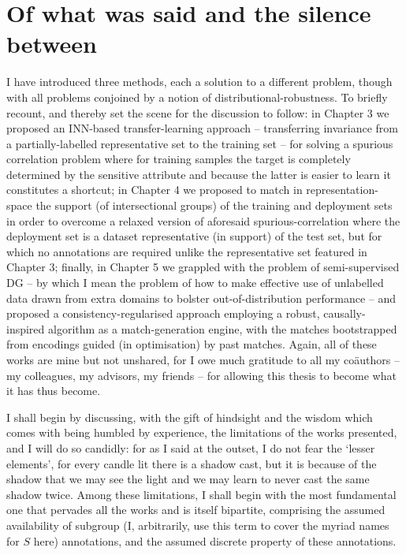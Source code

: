 \section*{Of what was said and the silence between}\label{sec:what-was-said}
%
I have introduced three methods, each a solution to a different problem, though with all problems
conjoined by a notion of distributional-robustness.
%
%
To briefly recount, and thereby set the scene for the discussion to follow: in Chapter 3 we
proposed an INN-based transfer-learning approach -- transferring invariance from a
partially-labelled representative set to the training set -- for solving a spurious correlation
problem where for training samples the target is completely determined by the sensitive attribute
and because the latter is easier to learn it constitutes a shortcut;
%
in Chapter 4 we proposed to match in representation-space the support (of intersectional groups) of
the training and deployment sets in order to overcome a relaxed version of aforesaid
spurious-correlation where the deployment set is a dataset representative (in support) of the test
set, but for which no annotations are required unlike the representative set featured in Chapter 3;
%
finally, in Chapter 5 we grappled with the problem of semi-supervised DG -- by which I mean the
problem of how to make effective use of unlabelled data drawn from extra domains to bolster
out-of-distribution performance -- and proposed a consistency-regularised approach employing a
robust, causally-inspired algorithm as a match-generation engine, with the matches bootstrapped
from encodings guided (in optimisation) by past matches.
%
Again, all of these works are mine but not unshared, for I owe much gratitude to all my
co{\"a}uthors -- my colleagues, my advisors, my friends -- for allowing this thesis to become what
it has thus become.

%
%
I shall begin by discussing, with the gift of hindsight and the wisdom which comes with being
humbled by experience, the limitations of the works presented, and I will do so candidly: for as I
said at the outset, I do not fear the `lesser elements', for every candle lit there is a shadow
cast, but it is because of the shadow that we may see the light and we may learn to never cast the
same shadow twice. %
%
Among these limitations, I shall begin with the most fundamental one that pervades all the works
and is itself bipartite, comprising the assumed availability of subgroup (I, arbitrarily, use this
term to cover the myriad names for \(S\) here) annotations, and the assumed discrete property of
these annotations.

